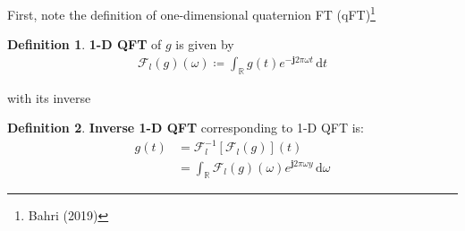 \documentclass[a4paper]{article}
\theoremstyle{definition}
\newtheorem{definition}{Definition}
\newcommand{\dt}{\, \text{d} t}
\begin{document}
First, note the definition of one-dimensional quaternion FT (qFT)\footnote{Bahri (2019)}
\begin{definition}
    \textbf{1-D QFT} of $g$ is given by
    \begin{align}
        \mathcal{F}_l \left( g \right) (\omega) \coloneqq \int_{\mathbb{R}} g(t) e^{-\mathbf{j} 2\pi \omega t} \dt
    \end{align}
\end{definition}
with its inverse
\begin{definition}
    \textbf{Inverse 1-D QFT} corresponding to 1-D QFT is:
    \begin{align}
        g(t) &= \mathcal{F}_l^{-1} \left[ \mathcal{F}_l (g) \right] (t) \\
        &= \int_{\mathbb{R}} \mathcal{F}_l (g) (\omega) e^{\mathbf{j} 2\pi \omega y}\,\text{d} \omega
    \end{align}
\end{definition}
\end{document}
